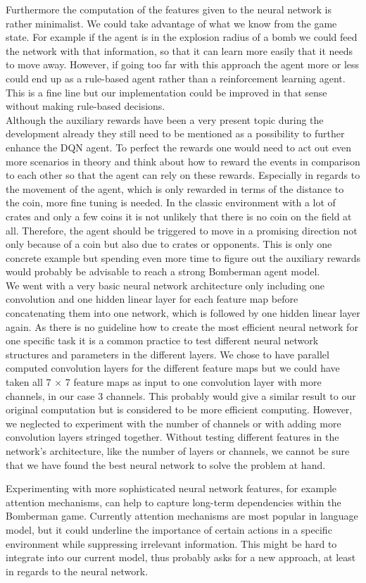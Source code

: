 Furthermore the computation of the features given to the neural network is rather minimalist. We could take advantage of what we know from the game state. For example if the agent is in the explosion radius of a bomb we could feed the network with that information, so that it can learn more easily that it needs to move away. However, if going too far with this approach the agent more or less could end up as a rule-based agent rather than a reinforcement learning agent. This is a fine line but our implementation could be improved in that sense without making rule-based decisions.\\ 

Although the auxiliary rewards have been a very present topic during the development already they still need to be mentioned as a possibility to further enhance the DQN agent. To perfect the rewards one would need to act out even more scenarios in theory and think about how to reward the events in comparison to each other so that the agent can rely on these rewards. Especially in regards to the movement of the agent, which is only rewarded in terms of the distance to the coin, more fine tuning is needed. In the classic environment with a lot of crates and only a few coins it is not unlikely that there is no coin on the field at all. Therefore, the agent should be triggered to move in a promising direction not only because of a coin but also due to crates or opponents. This is only one concrete example but spending even more time to figure out the auxiliary rewards would probably be advisable to reach a strong Bomberman agent model. \\

We went with a very basic neural network architecture only including one convolution and one hidden linear layer for each feature map before concatenating them into one network, which is followed by one hidden linear layer again. As there is no guideline how to create the most efficient neural network for one specific task it is a common practice to test different neural network structures and parameters in the different layers. We chose to have parallel computed convolution layers for the different feature maps but we could have taken all 7 $\times$ 7 feature maps as input to one convolution layer with more channels, in our case 3 channels. This probably would give a similar result to our original computation but is considered to be more efficient computing. However, we neglected to experiment with the number of channels or with adding more convolution layers stringed together. Without testing different features in the network's architecture, like the number of layers or channels, we cannot be sure that we have found the best neural network to solve the problem at hand.

Experimenting with more sophisticated neural network features, for example attention mechanisms, can help to capture long-term dependencies within the Bomberman game. Currently attention mechanisms are most popular in language model, but it could underline the importance of certain actions in a specific environment while suppressing irrelevant information. This might be hard to integrate into our current model, thus probably asks for a new approach, at least in regards to the neural network.
